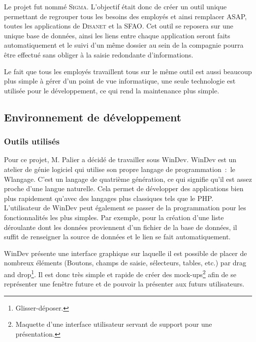 Le projet fut nommé \textsc{Sigma}.
L'objectif était donc de créer un outil unique permettant de regrouper tous les besoins des employés et ainsi remplacer ASAP, toutes les applications de \textsc{Disanet} et la SFAO.
Cet outil se reposera sur une unique base de données, ainsi les liens entre chaque application seront faits automatiquement et le suivi d'un même dossier au sein de la compagnie pourra être effectué sans obliger à la saisie redondante d'informations.

Le fait que tous les employés travaillent tous sur le même outil est aussi beaucoup plus simple à gérer d'un point de vue informatique, une seule technologie est utilisée pour le développement, ce qui rend la maintenance plus simple.

\subsection{Environnement de développement}

\subsubsection{Outils utilisés}

Pour ce projet, M. Palier a décidé de travailler sous WinDev.
WinDev est un atelier de génie logiciel qui utilise son propre langage de programmation~:~le Wlangage.
C’est un langage de quatrième génération, ce qui signifie qu’il est assez proche d’une langue naturelle.
Cela permet de développer des applications bien plus rapidement qu’avec des langages plus classiques tels que le PHP.
L’utilisateur de WinDev peut également se passer de la programmation pour les fonctionnalités les plus simples.
Par exemple, pour la création d’une liste déroulante dont les données proviennent d’un fichier de la base de données, il suffit de renseigner la source de données et le lien se fait automatiquement.

WinDev présente une interface graphique sur laquelle il est possible de placer de nombreux éléments (Boutons, champs de saisie, sélecteurs, tables, etc.) par drag and drop\footnote{Glisser-déposer.}.
Il est donc très simple et rapide de créer des mock-ups\footnote{Maquette d'une interface utilisateur servant de support pour une présentation.} afin de se représenter une fenêtre future et de pouvoir la présenter aux futurs utilisateurs.

